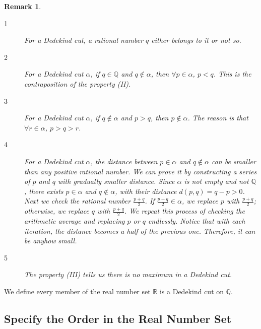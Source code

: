 \documentclass{article}
\newtheorem{remark}{Remark}[section]
\begin{document}
\begin{remark}
  \begin{description}
    \item[{1}] For a Dedekind cut, a rational number $q$ either belongs to it or 
    not so.
    \item[{2}] For a Dedekind cut $\alpha$, if $q \in \mathbb{Q}$ and 
    $q \notin \alpha$, then $\forall p \in \alpha$, $p < q$. This is the 
    contraposition of the property (II).
    \item[{3}] For a Dedekind cut $\alpha$, if $q \notin \alpha$ and $p > q$, 
    then $p \notin \alpha$. The reason is that $\forall r \in \alpha$, 
    $p > q > r$.
    \item[{4}] For a Dedekind cut $\alpha$, the distance between $p \in \alpha$ 
    and $q \notin \alpha$ can be smaller than any positive rational number. We 
    can prove it by constructing a series of $p$ and $q$ with gradually smaller 
    distance. Since $\alpha$ is not empty and not $\mathbb{Q}$, there exists 
    $p \in \alpha$ and $q \notin \alpha$, with their distance 
    $d(p, q) = q - p > 0$. Next we check the rational number $\frac{p + q}{2}$. 
    If $\frac{p + q}{2} \in \alpha$, we replace $p$ with $\frac{p + q}{2}$; 
    otherwise, we replace $q$ with $\frac{p + q}{2}$. We repeat this process of 
    checking the arithmetic average and replacing $p$ or $q$ endlessly. Notice 
    that with each iteration, the distance becomes a half of the previous one. 
    Therefore, it can be anyhow small.
    \item[{5}] The property (III) tells us there is no maximum in a Dedekind 
    cut.
  \end{description}
\end{remark}

We define every member of the real number set $\mathbb{R}$ is a Dedekind cut on 
$\mathbb{Q}$.

\subsection{Specify the Order in the Real Number Set}
\end{document}
